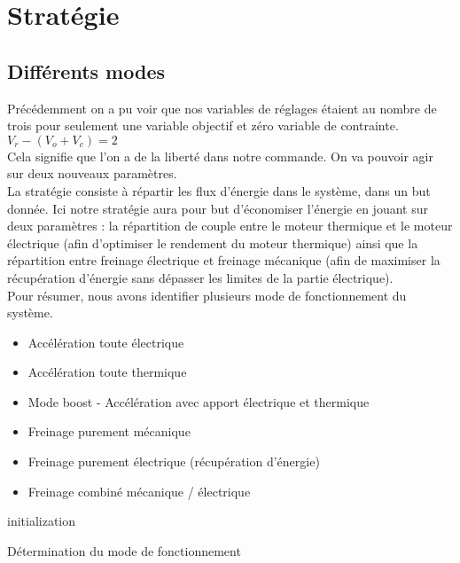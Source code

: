 \section{Stratégie}
\subsection{Différents modes}
Précédemment on a pu voir que nos variables de réglages étaient au nombre de trois pour seulement une variable objectif et zéro variable de contrainte.\\
$V_r - (V_o + V_c) = 2$ \\
Cela signifie que l'on a de la liberté dans notre commande. On va pouvoir agir sur deux nouveaux paramètres.\\

La stratégie consiste à répartir les flux d'énergie dans le système, dans un but donnée. Ici notre stratégie aura pour but d'économiser l'énergie en jouant sur deux paramètres : la répartition de couple entre le moteur thermique et le moteur électrique (afin d'optimiser le rendement du moteur thermique) ainsi que la répartition entre freinage électrique et freinage mécanique (afin de maximiser la récupération d'énergie sans dépasser les limites de la partie électrique).\\

Pour résumer, nous avons identifier plusieurs mode de fonctionnement du système.\\
\begin{itemize}
\item Accélération toute électrique
\item Accélération toute thermique
\item Mode boost - Accélération avec apport électrique et thermique
\item Freinage purement mécanique
\item Freinage purement électrique (récupération d'énergie)
\item Freinage combiné mécanique / électrique
\end{itemize}


\begin{algorithm}[H]
 \KwResult{}
 initialization\;
 \caption{Détermination du mode de fonctionnement}
\end{algorithm}

